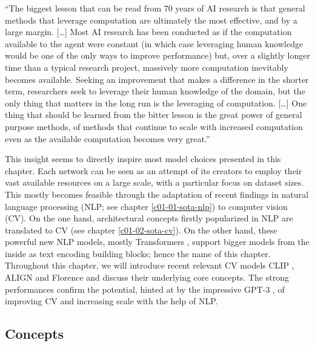\documentclass[
]{krantz}
\renewenvironment{quote}{\begin{VF}}{\end{VF}}
\begin{document}
\begin{quote}
``The biggest lesson that can be read from 70 years of AI research is that general methods that leverage computation are ultimately the most effective, and by a large margin.
{[}\ldots{]} Most AI research has been conducted as if the computation available to the agent were constant (in which case leveraging human knowledge would be one of the only ways to improve performance) but, over a slightly longer time than a typical research project, massively more computation inevitably becomes available.
Seeking an improvement that makes a difference in the shorter term, researchers seek to leverage their human knowledge of the domain, but the only thing that matters in the long run is the leveraging of computation.
{[}\ldots{]} One thing that should be learned from the bitter lesson is the great power of general purpose methods, of methods that continue to scale with increased computation even as the available computation becomes very great.''

\end{quote}

This insight seems to directly inspire most model choices presented in this chapter.
Each network can be seen as an attempt of its creators to employ their vast available resources on a large scale, with a particular focus on dataset sizes.
This mostly becomes feasible through the adaptation of recent findings in natural language processing (NLP; see chapter \ref{c01-01-sota-nlp}) to computer vision (CV).
On the one hand, architectural concepts firstly popularized in NLP are translated to CV \citep[e.g., self-supervised learning or the Vision Transformer;][]{ImageT} (see chapter \ref{c01-02-sota-cv}).
On the other hand, these powerful new NLP models, mostly Transformers \citep{vaswani2017attention}, support bigger models from the inside as text encoding building blocks; hence the name of this chapter.
Throughout this chapter, we will introduce recent relevant CV models CLIP \citep{radford2021learning}, ALIGN \citep{jia2021scaling} and Florence \citep{yuan2021florence} and discuss their underlying core concepts.
The strong performances confirm the potential, hinted at by the impressive GPT-3 \citep{brown2020language}, of improving CV and increasing scale with the help of NLP.

\hypertarget{concepts}{%
\subsection{Concepts}\label{concepts}}
\end{document}
